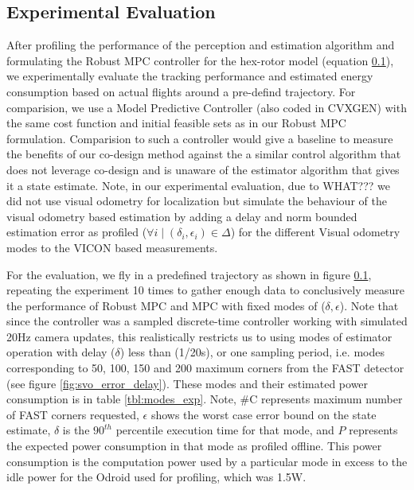\subsection{Experimental Evaluation}

After profiling the performance of the perception and estimation algorithm and formulating the Robust MPC controller for the hex-rotor model (equation \ref{}), we experimentally evaluate the tracking performance and estimated energy consumption based on actual flights around a pre-defind trajectory. For comparision, we use a Model Predictive Controller (also coded in CVXGEN) with the same cost function and initial feasible sets as in our Robust MPC formulation. Comparision to such a controller would give a baseline to measure the benefits of our co-design method against the a similar control algorithm that does not leverage co-design and is unaware of the estimator algorithm that gives it a state estimate. Note, in our experimental evaluation, due to WHAT??? we did not use visual odometry for localization but simulate the behaviour of the visual odometry based estimation by adding a delay and norm bounded estimation error as profiled ($\forall i \mid (\delta_i,\epsilon_i) \in \Delta $) for the different Visual odometry modes to the VICON based measurements. 

For the evaluation, we fly in a predefined trajectory as shown in figure \ref{}, repeating the experiment 10 times to gather enough data to conclusively measure the performance of Robust MPC and MPC with fixed modes of ($\delta,\epsilon$). Note that since the controller was a sampled discrete-time controller working with simulated 20Hz camera updates, this realistically restricts us to using modes of estimator operation with delay ($\delta$) less than (1/20s), or one sampling period, i.e. modes corresponding to 50, 100, 150 and 200 maximum corners from the FAST detector (see figure \ref{fig:svo_error_delay}). These modes and their estimated power consumption is in table \ref{tbl:modes_exp}. Note, \#C represents maximum number of FAST corners requested, $\epsilon$ shows the worst case error bound on the state estimate, $\delta$ is the $90^{th}$ percentile execution time for that mode, and $P$ represents the expected power consumption in that mode as profiled offline. This power consumption is the computation power used by a particular mode in excess to the idle power for the Odroid used for profiling, which was 1.5W.

